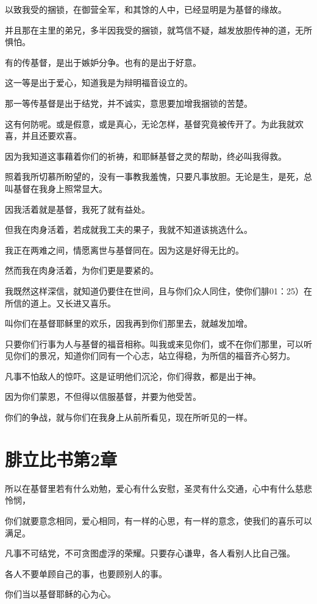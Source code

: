 \documentclass[12pt,oneside]{book}
\begin{document}
以致我受的捆锁，在御营全军，和其馀的人中，已经显明是为基督的缘故。

并且那在主里的弟兄，多半因我受的捆锁，就笃信不疑，越发放胆传神的道，无所惧怕。

有的传基督，是出于嫉妒分争。也有的是出于好意。

这一等是出于爱心，知道我是为辩明福音设立的。

那一等传基督是出于结党，并不诚实，意思要加增我捆锁的苦楚。

这有何防呢。或是假意，或是真心，无论怎样，基督究竟被传开了。为此我就欢喜，并且还要欢喜。

因为我知道这事藉着你们的祈祷，和耶稣基督之灵的帮助，终必叫我得救。

照着我所切慕所盼望的，没有一事教我羞愧，只要凡事放胆。无论是生，是死，总叫基督在我身上照常显大。

因我活着就是基督，我死了就有益处。

但我在肉身活着，若成就我工夫的果子，我就不知道该挑选什么。

我正在两难之间，情愿离世与基督同在。因为这是好得无比的。

然而我在肉身活着，为你们更是要紧的。

我既然这样深信，就知道仍要住在世间，且与你们众人同住，使你们腓01：25）在所信的道上。又长进又喜乐。

叫你们在基督耶稣里的欢乐，因我再到你们那里去，就越发加增。

只要你们行事为人与基督的福音相称。叫我或来见你们，或不在你们那里，可以听见你们的景况，知道你们同有一个心志，站立得稳，为所信的福音齐心努力。

凡事不怕敌人的惊吓。这是证明他们沉沦，你们得救，都是出于神。

因为你们蒙恩，不但得以信服基督，并要为他受苦。

你们的争战，就与你们在我身上从前所看见，现在所听见的一样。

\chapter{腓立比书第2章}
所以在基督里若有什么劝勉，爱心有什么安慰，圣灵有什么交通，心中有什么慈悲怜悯，

你们就要意念相同，爱心相同，有一样的心思，有一样的意念，使我们的喜乐可以满足。

凡事不可结党，不可贪图虚浮的荣耀。只要存心谦卑，各人看别人比自己强。

各人不要单顾自己的事，也要顾别人的事。

你们当以基督耶稣的心为心。
\end{document}
